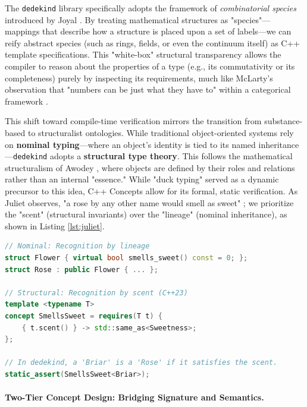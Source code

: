 \documentclass[11pt, a4paper]{report}
\begin{document}
The \texttt{dedekind} library specifically adopts the framework of \emph{combinatorial species} introduced by Joyal \cite{joyal1981species, joyal1986analytic}.
By treating mathematical structures as "species"—mappings that describe how a structure is placed upon a set of labels—we can reify abstract species (such as rings, fields, or even the continuum itself) as C++ template specifications.
This "white-box" structural transparency allows the compiler to reason about the properties of a type (e.g., its commutativity or its completeness) purely by inspecting its requirements, much like McLarty’s observation that "numbers can be just what they have to" within a categorical framework \cite{mclarty1993numbers}.

This shift toward compile-time verification mirrors the transition from substance-based to structuralist ontologies.
While traditional object-oriented systems rely on \textbf{nominal typing}---where an object’s identity is tied to its named inheritance---\texttt{dedekind} adopts a \textbf{structural type theory}.
This follows the mathematical structuralism of Awodey \cite{awodey2004structuralism}, where objects are defined by their roles and relations rather than an internal "essence."
While "duck typing" served as a dynamic precursor to this idea, C++ Concepts allow for its formal, static verification.
As Juliet observes, "a rose by any other name would smell as sweet" \cite{shakespeare1597romeo}; we prioritize the "scent" (structural invariants) over the "lineage" (nominal inheritance), as shown in Listing \ref{lst:juliet}.

\begin{lstlisting}[language=C++, caption={The Juliet Posture: Nominal vs. Structural Recognition.}, label={lst:juliet}]
// Nominal: Recognition by lineage
struct Flower { virtual bool smells_sweet() const = 0; };
struct Rose : public Flower { ... };

// Structural: Recognition by scent (C++23)
template <typename T>
concept SmellsSweet = requires(T t) {
    { t.scent() } -> std::same_as<Sweetness>;
};

// In dedekind, a 'Briar' is a 'Rose' if it satisfies the scent.
static_assert(SmellsSweet<Briar>);
\end{lstlisting}

\paragraph{Two-Tier Concept Design: Bridging Signature and Semantics.}
\end{document}
